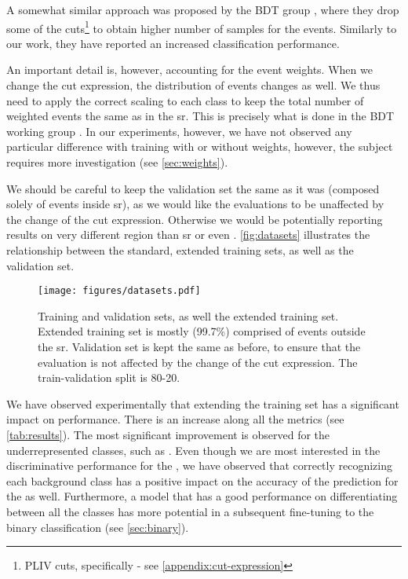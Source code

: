 A somewhat similar approach was proposed by the BDT group , where they drop some of
the cuts\footnote{PLIV cuts, specifically - see \autoref{appendix:cut-expression}} to obtain higher number
of samples for the \ttbar events. Similarly to our work, they have reported an increased classification performance.

An important detail is, however, accounting for the event weights. When we change the cut expression, the distribution
of events changes as well. We thus need to apply the correct scaling to each class to keep the total number of weighted
events the same as in the \gls{sr}. This is precisely what is done in the BDT working group .
In our experiments, however, we have not observed any particular difference with training with or without weights,
however, the subject requires more investigation (see \autoref{sec:weights}).

We should be careful to keep the validation set the same as it was (composed solely of events inside
\gls{sr}), as we would like the evaluations to be unaffected by the change of the cut expression. Otherwise we would be
potentially reporting results on very different region than \gls{sr} or even \lss. \autoref{fig:datasets} illustrates
the relationship between the standard, extended training sets, as well as the validation set.



\begin{figure}[htbp]
    \centering
    \texttt{[image: figures/datasets.pdf]}
    \caption[Training and validation sets, as well the extended training set.]
    {Training and validation sets, as well the extended training set. Extended training set is mostly (99.7\%)
        comprised of events outside the \gls{sr}. Validation set is kept the same as before, to ensure that the
        evaluation is not affected by the change of the cut expression. The train-validation split is 80-20.}
    \label{fig:datasets}
\end{figure}

We have observed experimentally that extending the training set has a significant impact on performance. There is an
increase along all the metrics (see \autoref{tab:results}). The most significant improvement is observed for the
underrepresented classes, such as \ttbar. Even though we are most interested in the discriminative performance for the
\tth, we have observed that correctly recognizing each background class has a positive impact on the accuracy of the
prediction for the \tth as well. Furthermore, a model that has a  good performance on differentiating between all the
classes has more potential in a subsequent fine-tuning to the binary classification (see \autoref{sec:binary}).
